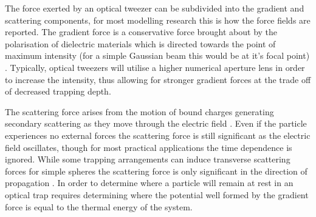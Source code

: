 The force exerted by an optical tweezer can be subdivided into 
the gradient and scattering components, for most modelling 
research this is how the force fields are reported. The gradient 
force is a conservative force brought about by the polarisation 
of dielectric materials which is directed towards the point of 
maximum intensity (for a simple Gaussian beam this would be at 
it's focal point) \cite{YasuhiroHarada1996}. Typically, optical 
tweezers will utilise a higher numerical aperture lens in order 
to increase the intensity, thus allowing for stronger gradient 
forces at the trade off of decreased trapping depth.

The scattering force arises from the motion of bound charges 
generating secondary scattering as they move through the 
electric field \cite{YasuhiroHarada1996}. Even if the particle
experiences no external forces the scattering force is still 
significant as the electric field oscillates, though for most
practical applications the time dependence is ignored. While 
some trapping arrangements can induce transverse scattering 
forces for simple spheres the scattering force is only 
significant in the direction of propagation \cite{Capitanio2002}.
In order to determine where a particle will remain at rest 
in an optical trap requires determining where the potential 
well formed by the gradient force is equal to the thermal 
energy of the system. 

